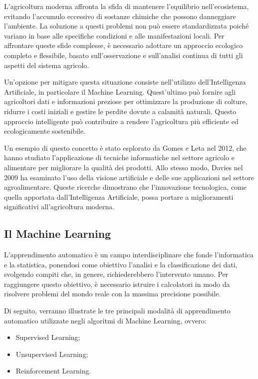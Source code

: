 L'agricoltura moderna affronta la sfida di mantenere l'equilibrio nell'ecosistema, evitando l'accumulo eccessivo di sostanze chimiche che possono danneggiare l'ambiente. La soluzione a questi problemi non può essere standardizzata poiché variano in base alle specifiche condizioni e alle manifestazioni locali. Per affrontare queste sfide complesse, è necessario adottare un approccio ecologico completo e flessibile, basato sull'osservazione e sull'analisi continua di tutti gli aspetti del sistema agricolo.

Un'opzione per mitigare questa situazione consiste nell'utilizzo dell'Intelligenza Artificiale, in particolare il Machine Learning. Quest'ultimo può fornire agli agricoltori dati e informazioni preziose per ottimizzare la produzione di colture, ridurre i costi iniziali e gestire le perdite dovute a calamità naturali. Questo approccio intelligente può contribuire a rendere l'agricoltura più efficiente ed ecologicamente sostenibile.

Un esempio di questo concetto è stato esplorato da Gomes e Leta nel 2012, che hanno studiato l'applicazione di tecniche informatiche nel settore agricolo e alimentare per migliorare la qualità dei prodotti. Allo stesso modo, Davies nel 2009 ha esaminato l'uso della visione artificiale e delle sue applicazioni nel settore agroalimentare. Queste ricerche dimostrano che l'innovazione tecnologica, come quella apportata dall'Intelligenza Artificiale, possa portare a miglioramenti significativi all'agricoltura moderna.

\subsection{Il Machine Learning}

L'apprendimento automatico è un campo interdisciplinare che fonde l'informatica e la statistica, ponendosi come obiettivo l'analisi e la classificazione dei dati, svolgendo compiti che, in genere, richiederebbero l'intervento umano. Per raggiungere questo obiettivo, è necessario istruire i calcolatori in modo da risolvere problemi del mondo reale con la massima precisione possibile.

Di seguito, verranno illustrate le tre principali modalità di apprendimento automatico utilizzate negli algoritmi di Machine Learning, ovvero:

\begin{itemize}
    \item Supervised Learning;
    \item Unsupervised Learning;
    \item Reinforcement Learning.
\end{itemize}

